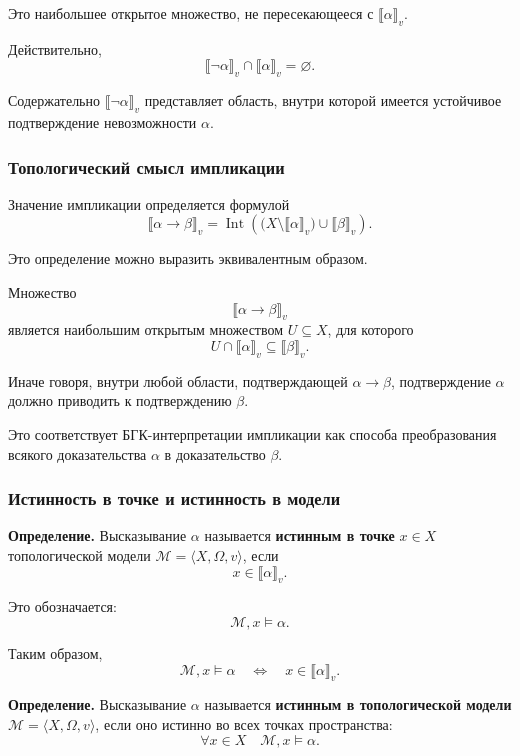 \documentclass[12pt,a4paper,oneside,openany]{book}
\theoremstyle{definition}
\theoremstyle{plain}
\theoremstyle{remark}
\begin{document}
Это наибольшее открытое множество, не пересекающееся с
\(\llbracket\alpha\rrbracket_v\).

Действительно,
\[
\llbracket\neg\alpha\rrbracket_v
\cap
\llbracket\alpha\rrbracket_v
=
\varnothing.
\]

Содержательно
\(\llbracket\neg\alpha\rrbracket_v\) представляет область, внутри
которой имеется устойчивое подтверждение невозможности
\(\alpha\).

\subsubsection{Топологический смысл импликации}

Значение импликации определяется формулой
\[
\llbracket\alpha\to\beta\rrbracket_v
=
\operatorname{Int}
\left(
\bigl(
X\setminus\llbracket\alpha\rrbracket_v
\bigr)
\cup
\llbracket\beta\rrbracket_v
\right).
\]

Это определение можно выразить эквивалентным образом.

Множество
\[
\llbracket\alpha\to\beta\rrbracket_v
\]
является наибольшим открытым множеством \(U\subseteq X\), для которого
\[
U\cap\llbracket\alpha\rrbracket_v
\subseteq
\llbracket\beta\rrbracket_v.
\]

Иначе говоря, внутри любой области, подтверждающей
\(\alpha\to\beta\), подтверждение \(\alpha\) должно приводить к
подтверждению \(\beta\).

Это соответствует БГК-интерпретации импликации как способа
преобразования всякого доказательства \(\alpha\) в доказательство
\(\beta\).

\subsubsection{Истинность в точке и истинность в модели}

\textbf{Определение.}
Высказывание \(\alpha\) называется
\textbf{истинным в точке} \(x\in X\) топологической модели
\(\mathcal M=\langle X,\Omega,v\rangle\), если
\[
x\in\llbracket\alpha\rrbracket_v.
\]

Это обозначается:
\[
\mathcal M,x\models\alpha.
\]

Таким образом,
\[
\mathcal M,x\models\alpha
\quad\Longleftrightarrow\quad
x\in\llbracket\alpha\rrbracket_v.
\]

\textbf{Определение.}
Высказывание \(\alpha\) называется
\textbf{истинным в топологической модели}
\(\mathcal M=\langle X,\Omega,v\rangle\), если оно истинно во всех
точках пространства:
\[
\forall x\in X
\quad
\mathcal M,x\models\alpha.
\]
\end{document}
